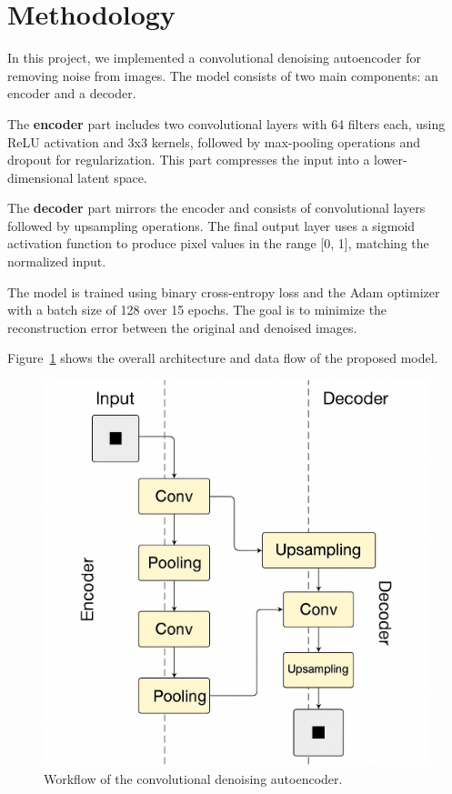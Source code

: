 \section{Methodology}

In this project, we implemented a convolutional denoising autoencoder for removing noise from images. The model consists of two main components: an encoder and a decoder.

The \textbf{encoder} part includes two convolutional layers with 64 filters each, using ReLU activation and 3x3 kernels, followed by max-pooling operations and dropout for regularization. This part compresses the input into a lower-dimensional latent space.

The \textbf{decoder} part mirrors the encoder and consists of convolutional layers followed by upsampling operations. The final output layer uses a sigmoid activation function to produce pixel values in the range [0, 1], matching the normalized input.

The model is trained using binary cross-entropy loss and the Adam optimizer with a batch size of 128 over 15 epochs. The goal is to minimize the reconstruction error between the original and denoised images.

Figure~\ref{fig:flowchart} shows the overall architecture and data flow of the proposed model.

\begin{figure}[ht]
    \centering
    \includegraphics[width=\linewidth]{figures/flowchart.png}
    \caption{Workflow of the convolutional denoising autoencoder.}
    \label{fig:flowchart}
\end{figure}